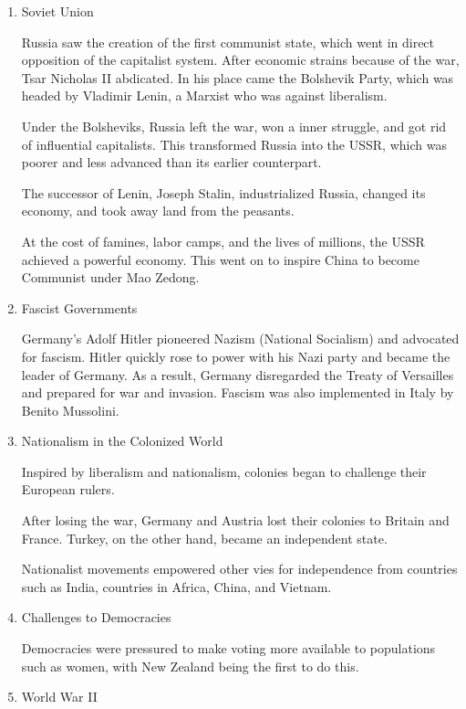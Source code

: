 \documentclass[11pt]{article}
\begin{document}
\begin{enumerate}
\item Soviet Union
\label{sec:orgcbd6a96}

Russia saw the creation of the first communist state, which went in direct opposition of the capitalist system. After economic strains because of the war, Tsar Nicholas II abdicated. In his place came the Bolshevik Party, which was headed by Vladimir Lenin, a Marxist who was against liberalism.

Under the Bolsheviks, Russia left the war, won a inner struggle, and got rid of influential capitalists. This transformed Russia into the USSR, which was poorer and less advanced than its earlier counterpart.

The successor of Lenin, Joseph Stalin, industrialized Russia, changed its economy, and took away land from the peasants.

At the cost of famines, labor camps, and the lives of millions, the USSR achieved a powerful economy. This went on to inspire China to become Communist under Mao Zedong.

\item Fascist Governments
\label{sec:org94cea76}

Germany's Adolf Hitler pioneered Nazism (National Socialism) and advocated for fascism. Hitler quickly rose to power with his Nazi party and became the leader of Germany. As a result, Germany disregarded the Treaty of Versailles and prepared for war and invasion. Fascism was also implemented in Italy by Benito Mussolini.

\item Nationalism in the Colonized World
\label{sec:org21f5ce6}

Inspired by liberalism and nationalism, colonies began to challenge their European rulers.

After losing the war, Germany and Austria lost their colonies to Britain and France. Turkey, on the other hand, became an independent state.

Nationalist movements empowered other vies for independence from countries such as India, countries in Africa, China, and Vietnam.

\item Challenges to Democracies
\label{sec:org43b5158}

Democracies were pressured to make voting more available to populations such as women, with New Zealand being the first to do this.

\item World War II
\label{sec:org120f957}


\end{enumerate}
\end{document}
